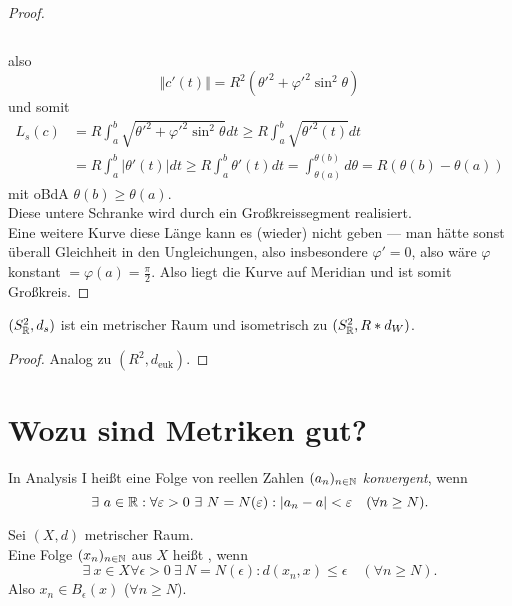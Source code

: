 \begin{lemma}
\begin{proof}
\begin{small}
\begin{equation*}
      \end{equation*}
    \end{small}
    also
    \begin{equation*}
      \Vert c'(t) \Vert = R^2({\theta'}^2 + {\varphi'}^2\sin^2\theta)
    \end{equation*}
    und somit
    \begin{align*}
      L_s(c) &= R\int_a^b\sqrt{{\theta'}^2+{\varphi'}^2\sin^2\theta}dt \geq R\int_a^b\sqrt{{\theta'}^2(t)}dt \\
      &= R\int_a^b \vert \theta'(t) \vert dt \geq R\int_a^b \theta'(t)dt = \int_{\theta(a)}^{\theta(b)}d\theta = R(\theta(b)-\theta(a))
    \end{align*}
    mit oBdA $ \theta(b) \geq \theta(a) $. \\
    Diese untere Schranke wird durch ein Großkreissegment realisiert. \\
    Eine weitere Kurve diese Länge kann es (wieder) nicht geben --- man hätte sonst überall Gleichheit in den Ungleichungen, also insbesondere $ \varphi' = 0 $, also wäre $ \varphi $ konstant $ = \varphi(a) = \frac{\pi}{2} $. Also liegt die Kurve auf Meridian und ist somit Großkreis.
  \end{proof}
\end{lemma}

\begin{theorem}
  $ (S^2_{\mathbb{R}}, d_s) $ ist ein metrischer Raum und isometrisch zu $ (S^2_{\mathbb{R}}, R*d_W) $.
  \begin{proof}
    Analog zu $ (R^2, d_\text{euk}) $.
  \end{proof}
\end{theorem}

\section{Wozu sind Metriken gut?}

\begin{remark}
  In Analysis I heißt eine Folge von reellen Zahlen $ (a_n)_{n \in \mathbb{N}} $ \emph{konvergent}, wenn
  \begin{equation*}
    \exists \ a \in \mathbb{R} : \forall \varepsilon > 0 \ \exists \ N = N(\varepsilon) : \vert a_n - a \vert < \varepsilon \quad (\forall n \geq N)\text{.}
  \end{equation*}
\end{remark}

\begin{remark}
  Sei $ (X, d) $ metrischer Raum. \\
  Eine Folge $ (x_n)_{n \in \mathbb{N}} $ aus $ X $ heißt , wenn
  \begin{equation*}
    \exists \ x \in X \forall \epsilon > 0 \ \exists \ N = N(\epsilon) : d(x_n, x) \leq \epsilon \quad (\forall n \geq N)\text{.}
  \end{equation*}
  Also $ x_n \in B_\epsilon(x) $ ($ \forall n \geq N $).
\end{remark}

